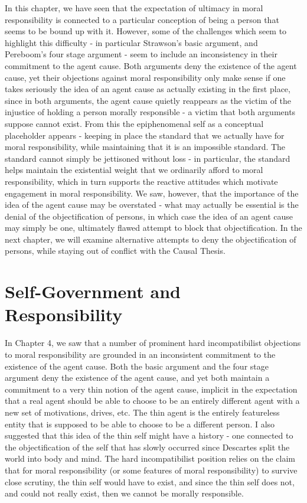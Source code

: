 \documentclass[phd,12pt,oneside,paper=letterpaper]{ubcthesis}
\begin{document}
In this chapter, we have seen that the expectation of ultimacy in moral responsibility is connected to a particular conception of being a person that seems to be bound up with it. However, some of the challenges which seem to highlight this difficulty - in particular Strawson's basic argument, and Pereboom's four stage argument - seem to include an inconsistency in their commitment to the agent cause. Both arguments deny the existence of the agent cause, yet their objections against moral responsibility only make sense if one takes seriously the idea of an agent cause as actually existing in the first place, since in both arguments, the agent cause quietly reappears as the victim of the injustice of holding a person morally responsible - a victim that both arguments suppose cannot exist. From this the epiphenomenal self as a conceptual placeholder appears - keeping in place the standard that we actually have for moral responsibility, while maintaining that it is an impossible standard. The standard cannot simply be jettisoned without loss - in particular, the standard helps maintain the existential weight that we ordinarily afford to moral responsibility, which in turn supports the reactive attitudes which motivate engagement in moral responsibility. We saw, however, that the importance of the idea of the agent cause may be overstated - what may actually be essential is the denial of the objectification of persons, in which case the idea of an agent cause may simply be one, ultimately flawed attempt to block that objectification. In the next chapter, we will examine alternative attempts to deny the objectification of persons, while staying out of conflict with the Causal Thesis. 

\chapter{Self-Government and Responsibility}
In Chapter 4, we saw that a number of prominent hard incompatibilist objections to moral responsibility are grounded in an inconsistent commitment to the existence of the agent cause. Both the basic argument and the four stage argument deny the existence of the agent cause, and yet both maintain a commitment to a very thin notion of the agent cause, implicit in the expectation that a real agent should be able to choose to be an entirely different agent with a new set of motivations, drives, etc. The thin agent is the entirely featureless entity that is supposed to be able to choose to be a different person. I also suggested that this idea of the thin self might have a history - one connected to the objectification of the self that has slowly occurred since Descartes split the world into body and mind. The hard incompatibilist position relies on the claim that for moral responsibility (or some features of moral responsibility) to survive close scrutiny, the thin self would have to exist, and since the thin self does not, and could not really exist, then we cannot be morally responsible.
\end{document}
